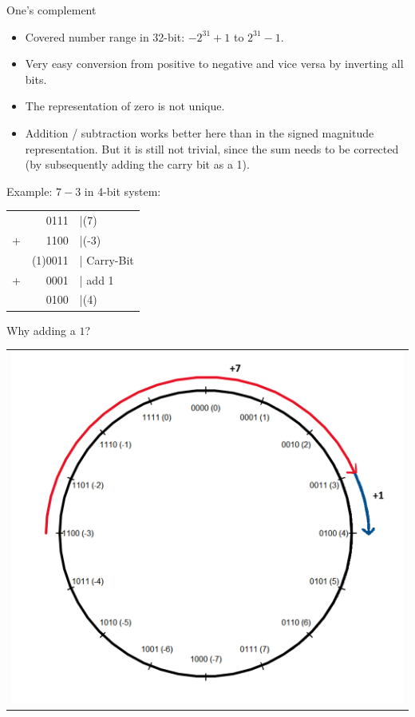 \documentclass[11pt,compress,t,notes=noshow, xcolor=table]{beamer}
\begin{document}
\begin{vbframe}{One's complement}
\framebreak
\begin{itemize}
\item Covered number range in 32-bit: $-2^{31}+1$ to $2^{31}-1$.
\item Very easy conversion from positive to negative and vice versa by inverting all bits.
\item The representation of zero is not unique.
\item Addition / subtraction works better here than in the signed magnitude representation. But it is still not trivial, since the sum needs to be corrected (by subsequently adding the carry bit as a 1).
\end{itemize}

Example: $7 - 3$ in 4-bit system:

\begin{center}
  \begin{tabular}{crl}
    &0111  &|(7)\\
    +&1100  &|(-3)\\\hline
    &(1)0011 &| Carry-Bit \\
    +&0001 &| add 1\\\hline
    &0100&|(4)
  \end{tabular}
\end{center}

\framebreak

Why adding a $1$?

\begin{center}
\begin{tabular}{l}
\includegraphics[width=0.4\paperwidth]{figure_man/1complement}
\end{tabular}
\end{center}


\end{vbframe}
\end{document}
